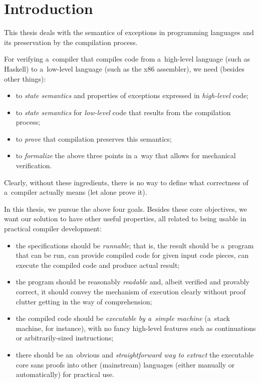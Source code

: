 \chapter*{Introduction}


This thesis deals with the semantics of exceptions in programming languages and its preservation
by the compilation process.

For verifying a~compiler that compiles code from a~high-level language (such as Haskell)
to a~low-level language (such as the x86 assembler), we need (besides other things):
\begin{itemize}
	\item to \emph{state semantics} and properties of exceptions expressed in \emph{high-level} code;
	\item to \emph{state semantics} for \emph{low-level} code that results from the compilation process;
	\item to \emph{prove} that compilation preserves this semantics;
	\item to \emph{formalize} the above three points in a~way that allows for mechanical verification.
\end{itemize}
Clearly, without these ingredients, there is no way to define what correctness of a~compiler actually
means (let alone prove it).

In this thesis, we pursue the above four goals.
Besides these core objectives, we want our solution to have other useful properties, all related
to being usable in practical compiler development:
\begin{itemize}
	\item the specifications should be \emph{runnable}; that is, the result should be a~program
		that can be run, can provide compiled code for given input code pieces, can execute
		the compiled code and produce actual result;
	\item the program should be reasonably \emph{readable} and, albeit verified and provably
		correct, it should convey the mechanism of execution clearly without proof clutter getting
		in the way of comprehension;
	\item the compiled code should be \emph{executable by a~simple machine} (a~stack machine,
		for instance), with no fancy high-level features such as continuations
		or arbitrarily-sized instructions;
	\item there should be an~obvious and \emph{straightforward way to extract} the executable core
		sans proofs into other (mainstream) languages (either manually or automatically)
		for practical use.
\end{itemize}

